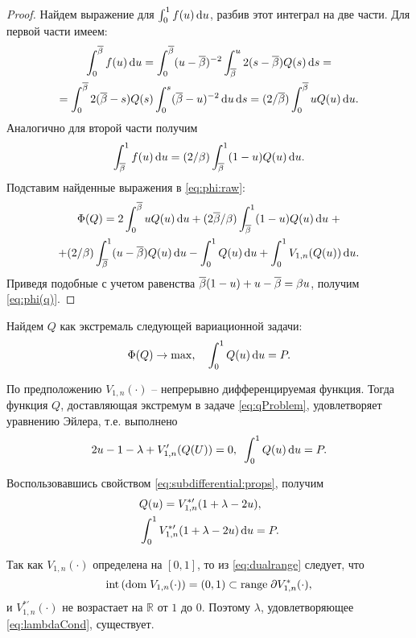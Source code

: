 {\begin{proof}
  Найдем выражение для $\int_0^1 f(u) \mathop{}\!\mathrm{d} u$, разбив этот интеграл на две части.
  Для первой части имеем:
  \begin{multline*}
    \int_0^{{\overline{\beta}}} f(u) \mathop{}\!\mathrm{d} u = \int_0^{{\overline{\beta}}} (u - {\overline{\beta}})^{-2} \int_{{\overline{\beta}}}^u 2(s - {\overline{\beta}}) Q(s) \mathop{}\!\mathrm{d} s = \\
    = \int_0^{{\overline{\beta}}} 2 ({\overline{\beta}} - s) Q(s) \int_0^s ({\overline{\beta}} - u)^{-2} \mathop{}\!\mathrm{d} u \mathop{}\!\mathrm{d} s =
    (2/{\overline{\beta}}) \int_0^{{\overline{\beta}}} u Q(u) \mathop{}\!\mathrm{d} u.
  \end{multline*}
  Аналогично для второй части получим
  \begin{gather*}
    \int_{{\overline{\beta}}}^1 f(u) \mathop{}\!\mathrm{d} u = (2/\beta) \int_{{\overline{\beta}}}^1 (1-u) Q(u) \mathop{}\!\mathrm{d} u.
  \end{gather*}
  Подставим найденные выражения в \eqref{eq:phi:raw}:
  \begin{multline*}
    \Phi(Q) = 2 \int_0^{{\overline{\beta}}} u Q(u) \mathop{}\!\mathrm{d} u + (2{\overline{\beta}}/\beta) \int_{{\overline{\beta}}}^1 (1-u) Q(u) \mathop{}\!\mathrm{d} u \; + \\
    + (2/\beta) \int_{{\overline{\beta}}}^1 (u - {\overline{\beta}}) Q(u) \mathop{}\!\mathrm{d} u - \int_0^1 Q(u) \mathop{}\!\mathrm{d} u + \int_0^1
    V_{1,n}(Q(u)) \mathop{}\!\mathrm{d} u.
  \end{multline*}
  Приведя подобные с учетом равенства ${\overline{\beta}} (1-u) + u - {\overline{\beta}} = \beta u$, получим
  \eqref{eq:phi(q)}.
\end{proof}

Найдем $Q$ как экстремаль следующей вариационной задачи:
\begin{align}
  \label{eq:qProblem}
  \Phi(Q) \rightarrow \max, \quad
  \int_0^1 Q(u) \mathop{}\!\mathrm{d} u = P.
\end{align}

По предположению $V_{1,n}(\cdot)$ -- непрерывно дифференцируемая функция.
Тогда функция $Q$, доставляющая экстремум в задаче \eqref{eq:qProblem}, удовлетворяет уравнению Эйлера, т.е. выполнено
\[
  2u - 1 - \lambda + V_{1,n}'(Q(U)) = 0, \enskip \int_0^1 Q(u) \mathop{}\!\mathrm{d} u = P.
\]

Воспользовавшись свойством \eqref{eq:subdifferential:props}, получим
\begin{align}
  \label{eq:qFormula}
  &Q(u) = V^{*\prime}_{1,n}(1+\lambda-2u),\\
  \label{eq:lambdaCond}
  &\int_0^1 V^{*\prime}_{1,n}(1+\lambda-2u) \mathop{}\!\mathrm{d} u = P.
\end{align}

Так как $V_{1,n}(\cdot)$ определена на $[0, 1]$, то из \eqref{eq:dualrange} следует, что
\begin{equation*}
  \mathrm{int} \left( \mathrm{dom\;} V_{1,n}(\cdot) \right)
  = (0, 1)
  \subset \mathrm{range\;} \partial V_{1,n}^*(\cdot),
\end{equation*}
и $V^{*\prime}_{1,n}(\cdot)$ не возрастает на $\mathbb{R}$ от $1$ до $0$.
Поэтому $\lambda$, удовлетворяющее \eqref{eq:lambdaCond}, существует.

}
